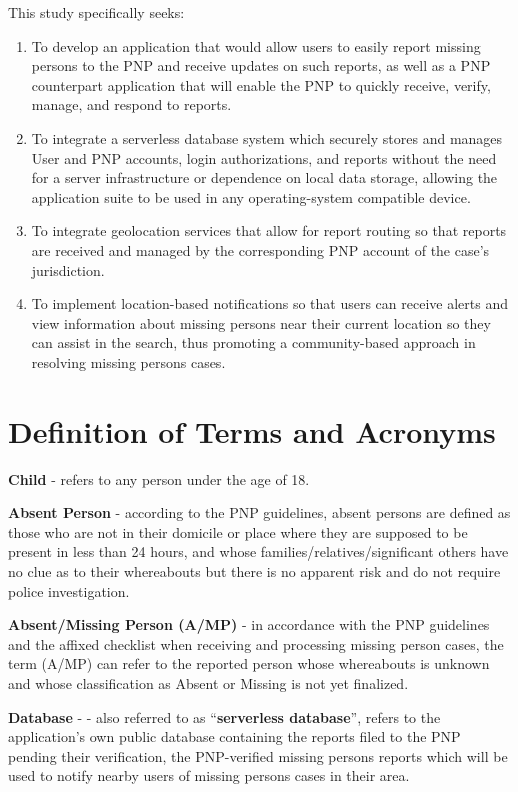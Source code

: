 This study specifically seeks:

\begin{enumerate}
   \item To develop an application that would allow users to easily report missing persons to the PNP and receive updates on such reports, as well as a PNP counterpart application that will enable the PNP to quickly receive, verify, manage, and respond to reports.
   \item To integrate a serverless database system which securely stores and manages User and PNP accounts, login authorizations, and reports without the need for a server infrastructure or dependence on local data storage, allowing the application suite to be used in any operating-system compatible device.
   \item To integrate geolocation services that allow for report routing so that reports are received and managed by the corresponding PNP account of the case’s jurisdiction. 
   \item To implement location-based notifications so that users can receive alerts and view information about missing persons near their current location so they can assist in the search, thus promoting a community-based approach in resolving missing persons cases.
\end{enumerate}

\section{Definition of Terms and Acronyms}

\textbf{Child} - refers to any person under the age of 18.

\textbf{Absent Person} - according to the PNP guidelines, absent persons are defined as those who are not in their domicile or place where they are supposed to be present in less than 24 hours, and whose families/relatives/significant others have no clue as to their whereabouts but there is no apparent risk and do not require police investigation.

\textbf{Absent/Missing Person (\textbf{A/MP}) }- in accordance with the PNP guidelines and the affixed checklist when receiving and processing missing person cases, the term (A/MP) can refer to the reported person whose whereabouts is unknown and whose classification as Absent or Missing is not yet finalized.

\textbf{Database} - - also referred to as “\textbf{serverless database}”, refers to the application’s own public database containing the reports filed to the PNP pending their verification, the PNP-verified missing persons reports which will be used to notify nearby users of missing persons cases in their area.

